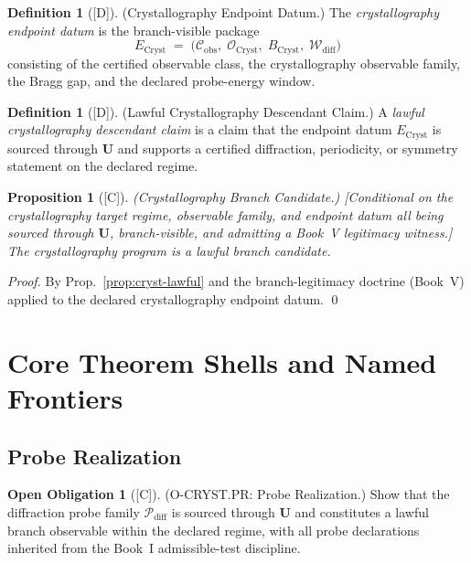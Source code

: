 \documentclass[12pt,oneside]{amsbook}
\theoremstyle{plain}
\newtheorem{proposition}[theorem]{Proposition}
\theoremstyle{definition}
\newtheorem{definition}[theorem]{Definition}
\newtheorem{obligation}[theorem]{Open Obligation}
\theoremstyle{remark}
\newcommand{\status}[1]{\textup{[#1]}}
\begin{document}
\begin{definition}[\status{D}]\label{def:cryst-endpoint}
\textup{(Crystallography Endpoint Datum.)}
The \emph{crystallography endpoint datum} is the branch-visible
package
\[
  E_{\mathrm{Cryst}} \;=\;
  \bigl(\mathcal{C}_{\mathrm{obs}},\;
        \mathcal{O}_{\mathrm{Cryst}},\;
        B_{\mathrm{Cryst}},\;
        \mathcal{W}_{\mathrm{diff}}\bigr)
\]
consisting of the certified observable class, the crystallography
observable family, the Bragg gap, and the declared probe-energy
window.
\end{definition}

\begin{definition}[\status{D}]\label{def:cryst-lawful-descendant}
\textup{(Lawful Crystallography Descendant Claim.)}
A \emph{lawful crystallography descendant claim} is a claim that
the endpoint datum $E_{\mathrm{Cryst}}$ is sourced through
$\mathbf{U}$ and supports a certified diffraction, periodicity,
or symmetry statement on the declared regime.
\end{definition}

\begin{proposition}[\status{C}]\label{prop:cryst-branch-candidate}
\textup{(Crystallography Branch Candidate.)}
\textup{[Conditional on the crystallography target regime, observable
family, and endpoint datum all being sourced through $\mathbf{U}$,
branch-visible, and admitting a Book~V legitimacy witness.]}
The crystallography program is a lawful branch candidate.
\end{proposition}

\begin{proof}
By Prop.~\ref{prop:cryst-lawful} and the branch-legitimacy doctrine
(Book~V) applied to the declared crystallography endpoint datum.
\qed
\end{proof}

\section{Core Theorem Shells and Named Frontiers}
\label{sec:cryst-theorems}

\subsection{Probe Realization}

\begin{obligation}[\status{C}]\label{ob:cryst-PR}
\textup{(O-CRYST.PR: Probe Realization.)}
Show that the diffraction probe family $\mathcal{P}_{\mathrm{diff}}$
is sourced through $\mathbf{U}$ and constitutes a lawful branch
observable within the declared regime, with all probe declarations
inherited from the Book~I admissible-test discipline.
\end{obligation}
\end{document}

